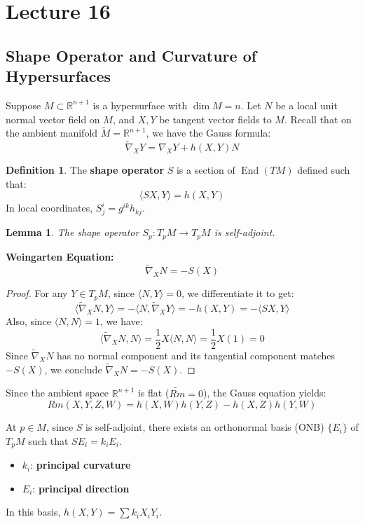 \documentclass[11pt, a4paper]{article}
\theoremstyle{plain}
\newtheorem{lemma}[theorem]{Lemma}
\theoremstyle{definition}
\newtheorem{definition}[theorem]{Definition}
\theoremstyle{remark}
\DeclareMathOperator{\End}{End}
\begin{document}
\newpage
{
\section{Lecture 16}

\newcommand{\II}{\mathrm{I\!I}} %
\newcommand{\R}{\mathbb{R}}


\subsection{Shape Operator and Curvature of Hypersurfaces}

Suppose $M \subset \R^{n+1}$ is a hypersurface with $\dim M = n$. Let $N$ be a local unit normal vector field on $M$, and $X, Y$ be tangent vector fields to $M$.
Recall that on the ambient manifold $\tilde{M} = \R^{n+1}$, we have the Gauss formula:
\[ \tilde{\nabla}_X Y = \nabla_X Y + h(X,Y)N \]

\begin{definition}
The \textbf{shape operator} $S$ is a section of $\End(TM)$ defined such that:
\[ \langle S X, Y \rangle = h(X, Y) \]
In local coordinates, $S^i_j = g^{ik} h_{kj}$.
\end{definition}

\begin{lemma}
The shape operator $S_p: T_pM \to T_pM$ is self-adjoint.
\end{lemma}

\noindent \textbf{Weingarten Equation:}
\[ \tilde{\nabla}_X N = -S(X) \]
\begin{proof}
For any $Y \in T_pM$, since $\langle N, Y \rangle = 0$, we differentiate it to get:
\[ \langle \tilde{\nabla}_X N, Y \rangle = -\langle N, \tilde{\nabla}_X Y \rangle = -h(X,Y) = -\langle SX, Y \rangle \]
Also, since $\langle N, N \rangle = 1$, we have:
\[ \langle \tilde{\nabla}_X N, N \rangle = \frac{1}{2} X \langle N, N \rangle = \frac{1}{2} X(1) = 0 \]
Since $\tilde{\nabla}_X N$ has no normal component and its tangential component matches $-S(X)$, we conclude $\tilde{\nabla}_X N = -S(X)$.
\end{proof}

\noindent Since the ambient space $\R^{n+1}$ is flat ($\tilde{Rm} = 0$), the Gauss equation yields:
\[ Rm(X,Y,Z,W) = h(X,W)h(Y,Z) - h(X,Z)h(Y,W) \]

At $p \in M$, since $S$ is self-adjoint, there exists an orthonormal basis (ONB) $\{E_i\}$ of $T_pM$ such that $S E_i = k_i E_i$.
\begin{itemize}
    \item $k_i$: \textbf{principal curvature}
    \item $E_i$: \textbf{principal direction}
\end{itemize}
In this basis, $h(X,Y) = \sum k_i X_i Y_i$.

}
\end{document}
